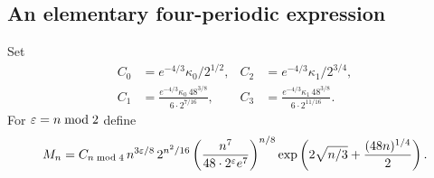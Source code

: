 \subsection{An elementary four-periodic expression}
Set
\begin{equation}\label{eq:four-constants}
 \begin{aligned}
 C_0&=e^{-4/3}\kappa_0/2^{1/2},&
 C_2&=e^{-4/3}\kappa_1/2^{3/4},\\
 C_1&=\frac{e^{-4/3}\kappa_0\,48^{3/8}}{6\cdot2^{7/16}},&
 C_3&=\frac{e^{-4/3}\kappa_1\,48^{3/8}}{6\cdot2^{11/16}}.
 \end{aligned}
\end{equation}
For $\varepsilon=n\bmod2$ define
\begin{equation}\label{eq:elementary-M}
 M_n=C_{n\bmod4}\,n^{3\varepsilon/8}\,2^{n^2/16}
 \left(\frac{n^7}{48\cdot2^\varepsilon e^7}\right)^{n/8}
 \exp\left(2\sqrt{n/3}+\frac{(48n)^{1/4}}2\right).
\end{equation}

